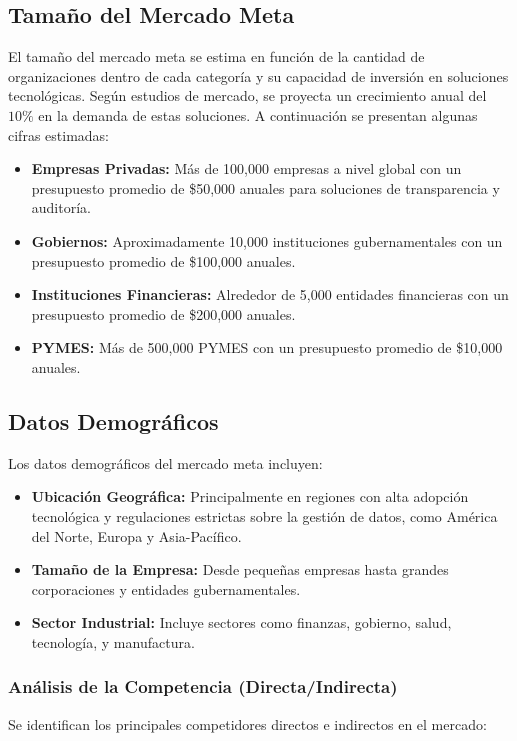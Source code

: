 \documentclass[a4paper,12pt]{article}
\begin{document}
\subsection{Tamaño del Mercado Meta}
El tamaño del mercado meta se estima en función de la cantidad de organizaciones dentro de cada categoría y su capacidad de inversión en soluciones tecnológicas. Según estudios de mercado, se proyecta un crecimiento anual del \(10\%\) en la demanda de estas soluciones. A continuación se presentan algunas cifras estimadas:

\begin{itemize}
    \item \textbf{Empresas Privadas:} Más de 100,000 empresas a nivel global con un presupuesto promedio de \$50,000 anuales para soluciones de transparencia y auditoría.
    \item \textbf{Gobiernos:} Aproximadamente 10,000 instituciones gubernamentales con un presupuesto promedio de \$100,000 anuales.
    \item \textbf{Instituciones Financieras:} Alrededor de 5,000 entidades financieras con un presupuesto promedio de \$200,000 anuales.
    \item \textbf{PYMES:} Más de 500,000 PYMES con un presupuesto promedio de \$10,000 anuales.
\end{itemize}

\subsection{Datos Demográficos}
Los datos demográficos del mercado meta incluyen:

\begin{itemize}
    \item \textbf{Ubicación Geográfica:} Principalmente en regiones con alta adopción tecnológica y regulaciones estrictas sobre la gestión de datos, como América del Norte, Europa y Asia-Pacífico.
    \item \textbf{Tamaño de la Empresa:} Desde pequeñas empresas hasta grandes corporaciones y entidades gubernamentales.
    \item \textbf{Sector Industrial:} Incluye sectores como finanzas, gobierno, salud, tecnología, y manufactura.
\end{itemize}

\subsubsection{Análisis de la Competencia (Directa/Indirecta)}
Se identifican los principales competidores directos e indirectos en el mercado:
\end{document}
